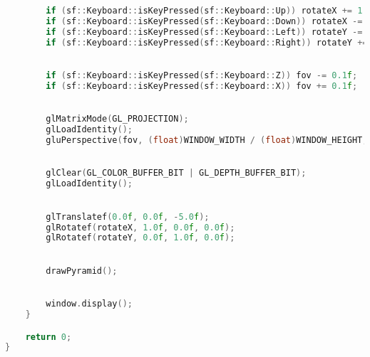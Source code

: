 \begin{lstlisting}[language=C++]
        
        if (sf::Keyboard::isKeyPressed(sf::Keyboard::Up)) rotateX += 1.0f;
        if (sf::Keyboard::isKeyPressed(sf::Keyboard::Down)) rotateX -= 1.0f;
        if (sf::Keyboard::isKeyPressed(sf::Keyboard::Left)) rotateY -= 1.0f;
        if (sf::Keyboard::isKeyPressed(sf::Keyboard::Right)) rotateY += 1.0f;

        
        if (sf::Keyboard::isKeyPressed(sf::Keyboard::Z)) fov -= 0.1f;
        if (sf::Keyboard::isKeyPressed(sf::Keyboard::X)) fov += 0.1f;

        
        glMatrixMode(GL_PROJECTION);
        glLoadIdentity();
        gluPerspective(fov, (float)WINDOW_WIDTH / (float)WINDOW_HEIGHT, 0.1, 100.0);

       
        glClear(GL_COLOR_BUFFER_BIT | GL_DEPTH_BUFFER_BIT);
        glLoadIdentity();

        
        glTranslatef(0.0f, 0.0f, -5.0f);
        glRotatef(rotateX, 1.0f, 0.0f, 0.0f);
        glRotatef(rotateY, 0.0f, 1.0f, 0.0f);

       
        drawPyramid();

        
        window.display();
    }

    return 0;
}
\end{lstlisting}
